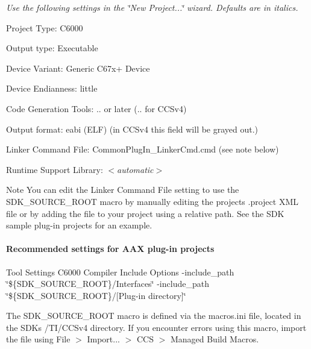  {\itshape  Use the following settings in the \char`\"{}\+New Project...\char`\"{} wizard. Defaults are in italics.} 
\begin{DoxyItemize}
\item Project Type\+: {\ttfamily C6000}  
\item Output type\+: {\ttfamily Executable}  
\item Device Variant\+: {\ttfamily Generic C67x+ Device}  
\item Device Endianness\+: {\ttfamily little}  
\item Code Generation Tools\+: {..} or later ({..} for C\+C\+Sv4)  
\item Output format\+: eabi (E\+L\+F) (in C\+C\+Sv4 this field will be grayed out.) 
\item Linker Command File\+: {\ttfamily Common\+Plug\+In\+\_\+\+Linker\+Cmd.\+cmd} (see note below)  
\item Runtime Support Library\+: {\itshape  $<$automatic$>$}  
\end{DoxyItemize}

\begin{DoxyNote}{Note}
You can edit the Linker Command File setting to use the {\ttfamily S\+D\+K\+\_\+\+S\+O\+U\+R\+C\+E\+\_\+\+R\+O\+O\+T} macro by manually editing the project\textquotesingle{}s .project X\+M\+L file or by adding the file to your project using a relative path. See the S\+D\+K sample plug-\/in projects for an example.
\end{DoxyNote}
\hypertarget{a00362_subsubsection__recommended_settings_for_aax_plugin_projects_}{}\paragraph{Recommended settings for A\+A\+X plug-\/in projects}\label{a00362_subsubsection__recommended_settings_for_aax_plugin_projects_}
  Tool Settings   C6000 Compiler   Include Options   -\/{\ttfamily include\+\_\+path \char`\"{}\$\{\+S\+D\+K\+\_\+\+S\+O\+U\+R\+C\+E\+\_\+\+R\+O\+O\+T\}/\+Interfaces\char`\"{}}  -\/{\ttfamily include\+\_\+path \char`\"{}\$\{\+S\+D\+K\+\_\+\+S\+O\+U\+R\+C\+E\+\_\+\+R\+O\+O\+T\}/\mbox{[}\+Plug-\/in directory\mbox{]}\char`\"{}}

The {\ttfamily S\+D\+K\+\_\+\+S\+O\+U\+R\+C\+E\+\_\+\+R\+O\+O\+T} macro is defined via the macros.\+ini file, located in the S\+D\+K\textquotesingle{}s /\+T\+I/\+C\+C\+Sv4 directory. If you encounter errors using this macro, import the file using File $>$ Import... $>$ C\+C\+S $>$ Managed Build Macros.

